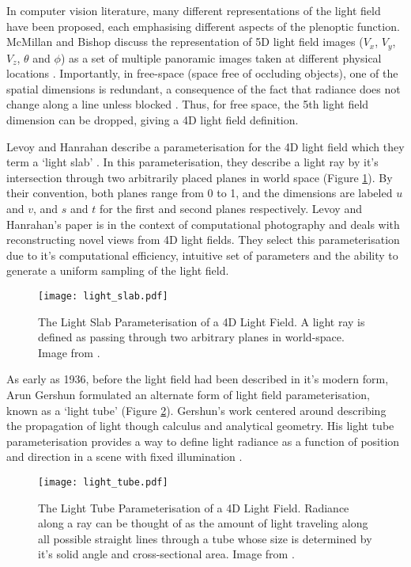 In computer vision literature, many different representations of the light field have been proposed, each emphasising different aspects of the plenoptic function.
McMillan and Bishop discuss the representation of 5D light field images ($V_x$, $V_y$, $V_z$, $\theta$ and $\phi$) as a set of multiple panoramic images taken at different physical locations \cite{mcmillan1995plenoptic}.
Importantly, in free-space (space free of occluding objects), one of the spatial dimensions is redundant, a consequence of the fact that radiance does not change along a line unless blocked \cite{levoy1996light}.
Thus, for free space, the 5th light field dimension can be dropped, giving a 4D light field definition.

Levoy and Hanrahan describe a parameterisation for the 4D light field which they term a \enquote*{light slab} \cite{levoy1996light}.
In this parameterisation, they describe a light ray by it's intersection through two arbitrarily placed planes in world space (Figure \ref{fig:light_slab}).
By their convention, both planes range from 0 to 1, and the dimensions are labeled $u$ and $v$, and $s$ and $t$ for the first and second planes respectively.
Levoy and Hanrahan's paper is in the context of computational photography and deals with reconstructing novel views from 4D light fields.
They select this parameterisation due to it's computational efficiency, intuitive set of parameters and the ability to generate a uniform sampling of the light field.

\begin{figure}[h]
\centering
\texttt{[image: light\_slab.pdf]}
\caption[The Light Slab Parameterisation of a 4D Light Field]{
The Light Slab Parameterisation of a 4D Light Field.
A light ray is defined as passing through two arbitrary planes in world-space.
Image from \cite{levoy1996light}.
}
\label{fig:light_slab}
\end{figure}

As early as 1936, before the light field had been described in it's modern form, Arun Gershun formulated an alternate form of light field parameterisation, known as a \enquote*{light tube} \cite{gershun1939light} (Figure \ref{fig:light_tube}).
Gershun's work centered around describing the propagation of light though calculus and analytical geometry.
His light tube parameterisation provides a way to define light radiance as a function of position and direction in a scene with fixed illumination \cite{levoy2010lectureslides}.

\begin{figure}[h]
\centering
\texttt{[image: light\_tube.pdf]}
\caption[The Light Tube Parameterisation of a 4D Light Field]{
The Light Tube Parameterisation of a 4D Light Field.
Radiance along a ray can be thought of as the amount of light traveling along all possible straight lines through a tube whose size is determined by it's solid angle and cross-sectional area.
Image from \cite{levoy2006light}.
}
\label{fig:light_tube}
\end{figure}

